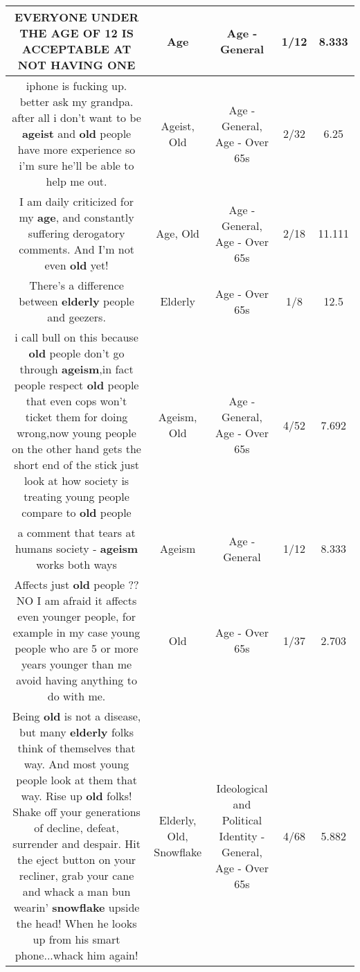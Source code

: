 \documentclass[11pt]{article}
\newlength\mylength
\begin{document}
\begin{center}
\begin{longtable}{|C{.65\mylength}|C{.30\mylength}|C{.12\mylength}|C{.12\mylength}|C{.12\mylength}|}
  \small EVERYONE UNDER THE \textbf{AGE} OF 12 IS ACCEPTABLE AT NOT HAVING ONE\normalsize   & Age & Age - General & 1/12 & 8.333 \\  \hline
  \small iphone is fucking up. better ask my grandpa. after all i don't want to be \textbf{ageist} and \textbf{old} people have more experience so i'm sure he'll be able to help me out.\normalsize   & Ageist, Old & Age - General, Age - Over 65s & 2/32 & 6.25 \\  \hline
  \small I am daily criticized for my \textbf{age}, and constantly suffering derogatory comments. And I'm not even \textbf{old} yet!\normalsize   & Age, Old & Age - General, Age - Over 65s & 2/18 & 11.111 \\  \hline
  \small There's a difference between \textbf{elderly} people and geezers.\normalsize   & Elderly & Age - Over 65s & 1/8 & 12.5 \\  \hline
  \small i call bull on this because \textbf{old} people don't go through \textbf{ageism},in fact people respect \textbf{old} people that even cops won't ticket them for doing wrong,now young people on the other hand gets the short end of the stick just look at how society is treating young people compare to \textbf{old} people\normalsize   & Ageism, Old & Age - General, Age - Over 65s & 4/52 & 7.692 \\  \hline
  \small a comment that tears at humans society - \textbf{ageism} works both ways\normalsize   & Ageism & Age - General & 1/12 & 8.333 \\  \hline
  \small Affects just \textbf{old} people ?? NO I am afraid it affects even younger people, for example in my case young people who are 5 or more years younger than me avoid having anything to do with me.\normalsize   & Old & Age - Over 65s & 1/37 & 2.703 \\  \hline
  \small Being \textbf{old} is not a disease, but many \textbf{elderly} folks think of themselves that way. And most young people look at them that way. Rise up \textbf{old} folks! Shake off your generations of decline, defeat, surrender and despair. Hit the eject button on your recliner, grab your cane and whack a man bun wearin' \textbf{snowflake} upside the head! When he looks up from his smart phone...whack him again!\normalsize   & Elderly, Old, Snowflake &  Ideological and Political Identity - General, Age - Over 65s & 4/68 & 5.882 \\  \hline

\end{longtable}
\end{center}
\end{document}
